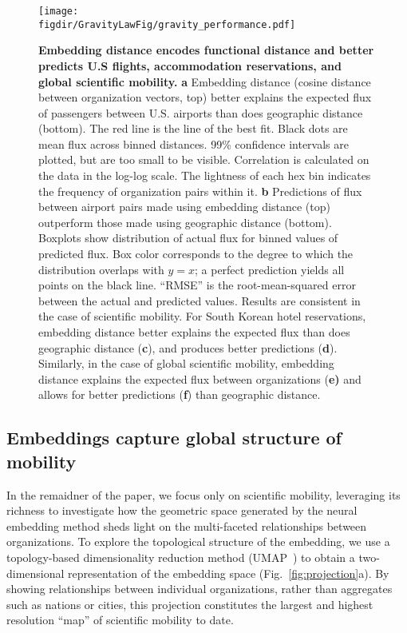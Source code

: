 \documentclass[12pt]{article} %
\def\figdir{../Figs}
\begin{document}
%
%
\begin{figure}[h!]
	\centering
	\texttt{[image: \\figdir/GravityLawFig/gravity\_performance.pdf]}
	\caption{
		\textbf{Embedding distance encodes functional distance and better predicts U.S flights, accommodation reservations, and global scientific mobility.}
		\textbf{a} Embedding distance (cosine distance between organization vectors, top) better explains the expected flux of passengers between U.S. airports than does geographic distance (bottom). 
		The red line is the line of the best fit.
		Black dots are mean flux across binned distances.
		99\% confidence intervals are plotted, but are too small to be visible.
		Correlation is calculated on the data in the log-log scale. 
		The lightness of each hex bin indicates the frequency of organization pairs within it.
		\textbf{b} Predictions of flux between airport pairs made using embedding distance (top) outperform those made using geographic distance (bottom). 
		Boxplots show distribution of actual flux for binned values of predicted flux.
		Box color corresponds to the degree to which the distribution overlaps with $y = x$;
		a perfect prediction yields all points on the black line.
		``RMSE'' is the root-mean-squared error between the actual and predicted values.
		Results are consistent in the case of scientific mobility. 
		For South Korean hotel reservations, embedding distance better explains the expected flux than does geographic distance (\textbf{c}), and produces better predictions (\textbf{d}).
		Similarly, in the case of global scientific mobility, embedding distance explains the expected flux between organizations (\textbf{e)} and allows for better predictions (\textbf{f}) than geographic distance.
	}
	\label{fig:gravity_performance}
\end{figure}


\subsection*{Embeddings capture global structure of mobility}

In the remaidner of the paper, we focus only on scientific mobility, leveraging its richness to investigate how the geometric space generated by the neural embedding method sheds light on the multi-faceted relationships between organizations. 
To explore the topological structure of the embedding, we use a topology-based dimensionality reduction method (UMAP~\autocite{mcinnes2018umap}) to obtain a two-dimensional representation of the embedding space (Fig.~\ref{fig:projection}a).
By showing relationships between individual organizations, rather than aggregates such as nations or cities, this projection constitutes the largest and highest resolution ``map'' of scientific mobility to date.
\end{document}
